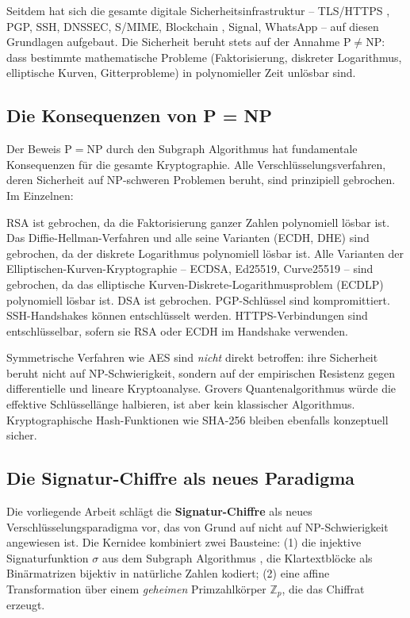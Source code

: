 ﻿\documentclass[a4paper,12pt]{scrreprt}
\theoremstyle{definition}
\begin{document}
Seitdem hat sich die gesamte digitale Sicherheitsinfrastruktur -- TLS/HTTPS \cite{Res18}, PGP, SSH, DNSSEC, S/MIME, Blockchain \cite{Nak08}, Signal, WhatsApp -- auf diesen Grundlagen aufgebaut. Die Sicherheit beruht stets auf der Annahme $\mathrm{P} \neq \mathrm{NP}$: dass bestimmte mathematische Probleme (Faktorisierung, diskreter Logarithmus, elliptische Kurven, Gitterprobleme) in polynomieller Zeit unlösbar sind.

\subsection{Die Konsequenzen von P = NP}

Der Beweis $\mathrm{P} = \mathrm{NP}$ durch den Subgraph Algorithmus \cite{Epp26a} hat fundamentale Konsequenzen für die gesamte Kryptographie. Alle Verschlüsselungsverfahren, deren Sicherheit auf NP-schweren Problemen beruht, sind prinzipiell gebrochen. Im Einzelnen:

RSA \cite{Riv78} ist gebrochen, da die Faktorisierung ganzer Zahlen polynomiell lösbar ist. Das Diffie-Hellman-Verfahren \cite{DH76} und alle seine Varianten (ECDH, DHE) sind gebrochen, da der diskrete Logarithmus polynomiell lösbar ist. Alle Varianten der Elliptischen-Kurven-Kryptographie -- ECDSA, Ed25519, Curve25519 -- sind gebrochen, da das elliptische Kurven-Diskrete-Logarithmusproblem (ECDLP) polynomiell lösbar ist. DSA ist gebrochen. PGP-Schlüssel sind kompromittiert. SSH-Handshakes können entschlüsselt werden. HTTPS-Verbindungen sind entschlüsselbar, sofern sie RSA oder ECDH im Handshake verwenden.

Symmetrische Verfahren wie AES \cite{DR02} sind \emph{nicht} direkt betroffen: ihre Sicherheit beruht nicht auf NP-Schwierigkeit, sondern auf der empirischen Resistenz gegen differentielle \cite{BS93} und lineare \cite{Mat94} Kryptoanalyse. Grovers Quantenalgorithmus \cite{Gro96} würde die effektive Schlüssellänge halbieren, ist aber kein klassischer Algorithmus. Kryptographische Hash-Funktionen wie SHA-256 \cite{NIST15a} bleiben ebenfalls konzeptuell sicher.

\subsection{Die Signatur-Chiffre als neues Paradigma}

Die vorliegende Arbeit schlägt die \textbf{Signatur-Chiffre} als neues Verschlüsselungsparadigma vor, das von Grund auf nicht auf NP-Schwierigkeit angewiesen ist. Die Kernidee kombiniert zwei Bausteine: (1) die injektive Signaturfunktion $\sigma$ aus dem Subgraph Algorithmus \cite{Epp26a}, die Klartextblöcke als Binärmatrizen bijektiv in natürliche Zahlen kodiert; (2) eine affine Transformation über einem \emph{geheimen} Primzahlkörper $\mathbb{Z}_p$, die das Chiffrat erzeugt.
\end{document}
